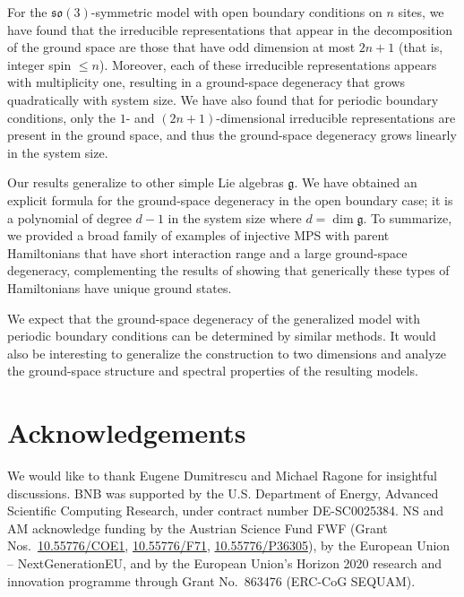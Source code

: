 \documentclass[a4paper]{article}
\newcommand{\so}{\mathfrak{so}}
\theoremstyle{definition}
\begin{document}
For the $\so(3)$-symmetric model with open boundary conditions on $n$ sites, we have found that the irreducible representations that appear in the decomposition of the ground space are those that have odd dimension at most $2n+1$ (that is, integer spin $\le n$). Moreover, each of these irreducible representations appears with multiplicity one, resulting in a ground-space degeneracy that grows quadratically with system size. We have also found that for periodic boundary conditions, only the $1$- and $(2n+1)$-dimensional irreducible representations are present in the ground space, and thus the ground-space degeneracy grows linearly in the system size.

Our results generalize to other simple Lie algebras $\mathfrak{g}$. We have obtained an explicit formula for the ground-space degeneracy in the open boundary case; it is a polynomial of degree $d-1$ in the system size where $d=\dim\mathfrak{g}$.
To summarize, we provided a broad family of examples of injective MPS with parent Hamiltonians that have short interaction range and a large ground-space degeneracy, complementing the results of \cite{schuch2025} showing that generically these types of Hamiltonians have unique ground states. 

We expect that the ground-space degeneracy of the generalized model with periodic boundary conditions can be determined by similar methods. It would also be interesting to generalize the construction to two dimensions and analyze the ground-space structure and spectral properties of the resulting models. 



\section*{Acknowledgements}

We would like to thank Eugene Dumitrescu and Michael Ragone for insightful discussions.
BNB was supported by the U.S. Department of Energy, Advanced Scientific
Computing Research, under contract number DE-SC0025384.  NS and AM
acknowledge funding by the Austrian Science Fund FWF (Grant
Nos.~\href{https://doi.org/10.55776/COE1}{10.55776/COE1},
\href{https://doi.org/10.55776/F71}{10.55776/F71},
\href{https://doi.org/10.55776/P36305}{10.55776/P36305}), by the European Union
-- NextGenerationEU, and by the European Union’s Horizon 2020 research and
innovation programme through Grant No.~863476 (ERC-CoG \mbox{SEQUAM}).

\printbibliography
\end{document}
